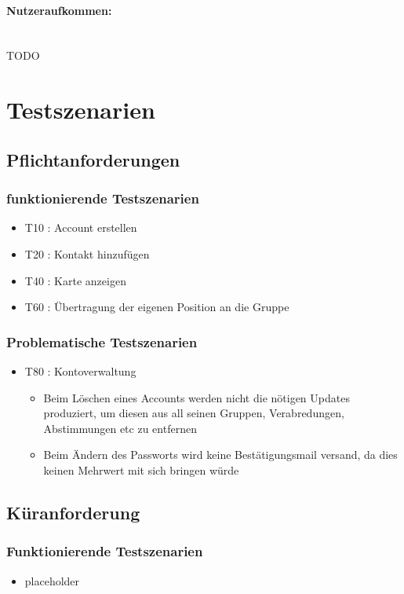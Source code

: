 \documentclass[parskip=full,11pt]{scrartcl}
\begin{document}
\paragraph{\small Nutzeraufkommen:} \hspace{0pt} \\
TODO

\section{Testszenarien}

\subsection{Pflichtanforderungen}
	\subsubsection{funktionierende Testszenarien}
	\begin{itemize}
		\item T10 : Account erstellen
		\item T20 : Kontakt hinzufügen
		\item T40 : Karte anzeigen
		\item T60 : Übertragung der eigenen Position an die Gruppe
	\end{itemize}

	\subsubsection{Problematische Testszenarien}
	\begin{itemize}
		\item T80 : Kontoverwaltung
			\begin{itemize}
			\item Beim Löschen eines Accounts werden nicht die nötigen Updates
			produziert, um diesen aus all seinen Gruppen, Verabredungen, Abstimmungen
			etc zu entfernen
			\item Beim Ändern des Passworts wird keine Bestätigungsmail versand, da
			dies keinen Mehrwert mit sich bringen würde
			\end{itemize}
	\end{itemize}

\subsection{Küranforderung}
	\subsubsection{Funktionierende Testszenarien}
	\begin{itemize}
	\item placeholder
	\end{itemize}
\end{document}
